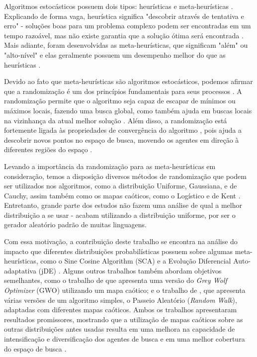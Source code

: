 \documentclass[11pt]{article}
\begin{document}
Algoritmos estocásticos possuem dois tipos: heurísticas e meta-heurísticas \cite{yang}. Explicando de forma vaga, heurística significa "descobrir através de tentativa e erro" \-- soluções boas para um problema complexo podem ser encontradas em um tempo razoável, mas não existe garantia que a solução ótima será encontrada \cite{yang}. Mais adiante, foram desenvolvidas as meta-heurísticas, que significam "além" ou "alto-nível" e elas geralmente possuem um desempenho melhor do que as heurísticas \cite{yang}.

Devido ao fato que meta-heurísticas são algoritmos estocásticos, podemos afirmar que a randomização é um dos princípios fundamentais para seus processos \cite{yang2}. A randomização permite que o algoritmo seja capaz de escapar de mínimos ou máximos locais, fazendo uma busca global, como também ajuda em buscas locais na vizinhança da atual melhor solução \cite{yang2}. Além disso, a randomização está fortemente ligada às propriedades de convergência do algoritmo \cite{caponetto}, pois ajuda a descobrir novos pontos no espaço de busca, movendo os agentes em direção à diferentes regiões do espaço \cite{fister}.

Levando a importância da randomização para as meta-heurísticas em consideração, temos a disposição diversos métodos de randomização que podem ser utilizados nos algoritmos, como a distribuição Uniforme, Gaussiana, e de Cauchy, assim também como os mapas caóticos, como o Logístico e de Kent \cite{fister}. Entretanto, grande parte dos estudos não fazem uma análise de qual a melhor distribuição a se usar - acabam utilizando a distribuição uniforme, por ser o gerador aleatório padrão de muitas linguagens.

Com essa motivação, a contribuição deste trabalho se encontra na análise do impacto que diferentes distribuições probabilísticas possuem sobre algumas meta-heurísticas, como o Sine Cosine Algorithm (SCA) \cite{mirjalili} e a Evolução Diferencial Auto-adaptativa (jDE) \cite{brest}. Alguns outros trabalhos também abordam objetivos semelhantes, como o trabalho de \cite{saxena} que apresenta uma versão do \textit{Grey Wolf Optimizer} (GWO) utilizando um mapa caótico; e o trabalho de \cite{jana}, que apresenta várias versões de um algoritmo simples, o Passeio Aleatório (\textit{Random Walk}), adaptadas com diferentes mapas caóticos. Ambos os trabalhos apresentaram resultados promissores, mostrando que a utilização de mapas caóticos sobre as outras distribuições antes usadas resulta em uma melhora na capacidade de intensificação e diversificação dos agentes de busca \cite{saxena} e em uma melhor cobertura do espaço de busca \cite{jana}. 
\end{document}
